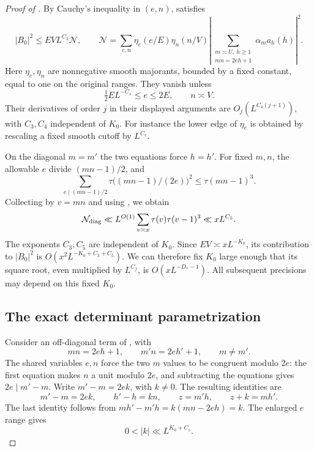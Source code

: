 \begin{proof}[Proof of ]
By Cauchy's inequality in $(e,n)$,  satisfies
\begin{equation}\label{eq:typeii-cauchy}
 |B_0|^2\leq EVL^{C_3}\mathcal N,
 \qquad
 \mathcal N=\sum_{e,n}\eta_e(e/E)\eta_n(n/V)
 \left|\sum_{\substack{m\asymp U,\ h\geq1\\mn=2eh+1}}
                           \alpha_ma_h(h)\right|^2.
\end{equation}
Here $\eta_e,\eta_n$ are nonnegative smooth majorants, bounded by a fixed
constant, equal to one on the original ranges. They vanish unless
\[
 \tfrac12 EL^{-C_s}\leq e\leq2E,\qquad n\asymp V.
\]
Their derivatives of order $j$ in their displayed arguments are
$O_j(L^{C_4(j+1)})$, with $C_3,C_4$ independent of $K_0$.
For instance the lower edge of $\eta_e$ is obtained by rescaling a
fixed smooth cutoff by $L^{C_s}$.

On the diagonal $m=m'$ the two equations force $h=h'$. For fixed $m,n$,
the allowable $e$ divide $(mn-1)/2$, and
\[
 \sum_{e\mid(mn-1)/2}\tau\bigl((mn-1)/(2e)\bigr)^2
                            \leq\tau(mn-1)^3.
\]
Collecting by $v=mn$ and using , we obtain
\begin{equation}\label{eq:typeii-diagonal}
 \mathcal N_{\rm diag}
 \ll L^{O(1)}\sum_{v\asymp x}\tau(v)\tau(v-1)^3
 \ll xL^{C_5}.
\end{equation}
The exponents $C_3,C_5$ are independent of $K_0$. Since
$EV\asymp xL^{-K_0}$, its contribution to $|B_0|^2$ is
$O(x^2L^{-K_0+C_3+C_5})$. We can therefore fix $K_0$ large enough
that its square root, even multiplied by $L^{C_{f}}$, is
$O(xL^{-D_*-1})$. All subsequent precisions may depend on this fixed
$K_0$.

\subsection{The exact determinant parametrization}

Consider an off-diagonal term of , with
\begin{equation}\label{eq:typeii-two-equations}
       mn=2eh+1,\qquad m'n=2eh'+1,\qquad m\ne m'.
\end{equation}
The shared variables $e,n$ force the two $m$ values to be congruent
modulo $2e$: the first equation makes $n$ a unit modulo $2e$, and
subtracting the equations gives $2e\mid m'-m$. Write
$m'-m=2ek$, with $k\ne0$. The resulting identities are
\begin{equation}\label{eq:typeii-determinant}
 m'-m=2ek,\qquad h'-h=kn,\qquad
 z=m'h,\qquad z+k=mh'.
\end{equation}
The last identity follows from
$mh'-m'h=k(mn-2eh)=k$. The enlarged $e$ range gives
\begin{equation}\label{eq:typeii-k-range}
                  0<|k|\ll L^{K_0+C_s}.
\end{equation}


\end{proof}
